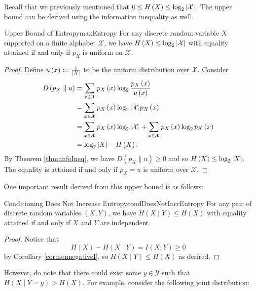 \documentclass[math, code]{amznotes}
\theoremstyle{remark}
\begin{document}
Recall that we previously mentioned that $0 \leq H\left(X\right) \leq \log_2{\left\lvert {\mathcal{X}} \right\rvert}$. The upper bound can be derived using the information inequality as well.
\begin{probox}{Upper Bound of Entropy}{maxEntropy}
    For any discrete random variable $X$ supported on a finite alphabet $\mathcal{X}$, we have $H\left(X\right) \leq \log_2{\left\lvert {\mathcal{X}} \right\rvert}$ with equality attained if and only if $p_X$ is uniform on $\mathcal{X}$.
    \tcblower
    \begin{proof}
        Define $u\left(x\right) \coloneqq \frac{1}{{\left\lvert {\mathcal{X}} \right\rvert}}$ to be the uniform distribution over $\mathcal{X}$. Consider 
        \begin{align*}
            D\left(p_X \parallel u\right) & = \sum_{x \in \mathcal{X}}p_X\left(x\right)\log_2\frac{p_X\left(x\right)}{u\left(x\right)} \\
            & = \sum_{x \in \mathcal{X}}p_X\left(x\right)\log_2{\left\lvert {\mathcal{X}} \right\rvert}p_X\left(x\right) \\
            & = \sum_{x \in \mathcal{X}}p_X\left(x\right)\log_2{\left\lvert {\mathcal{X}} \right\rvert} + \sum_{x \in \mathcal{X}}p_X\left(x\right)\log_2p_X\left(x\right) \\
            & = \log_2{\left\lvert {X} \right\rvert} - H\left(X\right).
        \end{align*}
        By Theorem \ref{thm:infoIneq}, we have $D\left(p_X \parallel u\right) \geq 0$ and so $H\left(X\right) \leq \log_2{\left\lvert {X} \right\rvert}$. The equality is attained if and only if $p_X = u$ is uniform over $\mathcal{X}$.
    \end{proof}
\end{probox}
One important result derived from this upper bound is as follows:
\begin{corbox}{Conditioning Does Not Increase Entropy}{condDoesNotIncrEntropy}
    For any pair of discrete random variables $\left(X, Y\right)$, we have $H\left(X \mid Y\right) \leq H\left(X\right)$ with equality attained if and only if $X$ and $Y$ are independent.
    \tcblower
    \begin{proof}
        Notice that 
        \begin{equation*}
            H\left(X\right) - H\left(X \mid Y\right) = I\left(X ; Y\right) \geq 0
        \end{equation*}
        by Corollary \ref{cor:nonnegativeI}, so $H\left(X \mid Y\right) \leq H\left(X\right)$ as desired.
    \end{proof}
\end{corbox}
However, do note that there could exist some $y \in \mathcal{Y}$ such that $H\left(X \mid Y = y\right) > H\left(X\right)$. For example, consider the following joint distribution:
\end{document}
